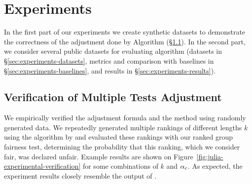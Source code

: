 \section{Experiments}\label{sec:experiments}
In the first part of our experiments we create synthetic datasets to demonstrate the correctness of the adjustment done by Algorithm \algoCorrect (\S\ref{subsubsec:JuliaExperimentalVerification}).
%
In the second part, we consider several public datasets for evaluating algorithm \algoFAIR (datasets in \S\ref{sec:experiments-datasets}, metrics and comparison with baselines in \S\ref{sec:experiments-baselines}, and results in \S\ref{sec:experiments-results}).

\subsection{Verification of Multiple Tests Adjustment}
\label{subsubsec:JuliaExperimentalVerification}

We empirically verified the adjustment formula and the \algoCorrect method using randomly generated data.
%
We repeatedly generated multiple rankings of different lengths $k$ using the algorithm by \citet{yang2016measuring} and evaluated these rankings with our ranked group fairness test, determining the probability that this ranking, which we consider fair, was declared unfair.
%
Example results are shown on Figure~\ref{fig:julia-experimental-verification} for some combinations of $k$ and $\alpha_c$.
%
As expected, the experiment results closely resemble the output of \algoCorrect.

